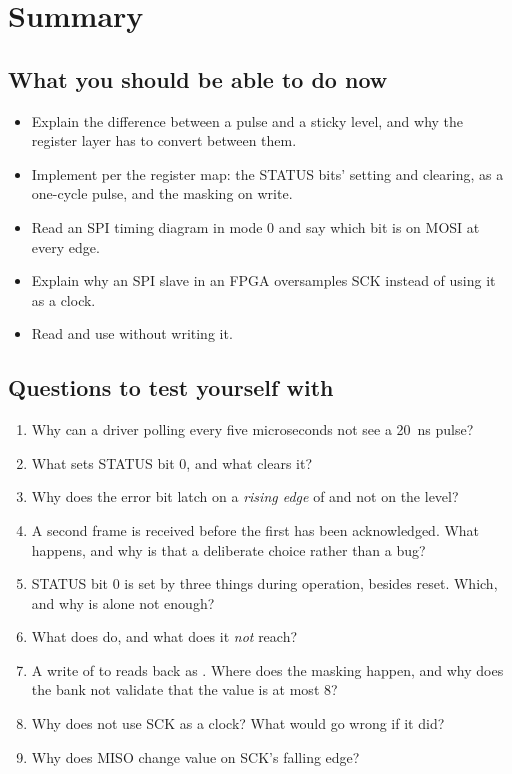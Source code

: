 
\section{Summary}
\label{c18:sec:review}

\subsection*{What you should be able to do now}
\begin{itemize}
  \item Explain the difference between a pulse and a sticky level, and why the register layer has to
    convert between them.
  \item Implement  per the register map: the STATUS bits' setting and
    clearing,  as a one-cycle pulse, and the masking on write.
  \item Read an SPI timing diagram in mode 0 and say which bit is on MOSI at every edge.
  \item Explain why an SPI slave in an FPGA oversamples SCK instead of using it as a clock.
  \item Read and use  without writing it.
\end{itemize}

\subsection*{Questions to test yourself with}
\begin{enumerate}
  \item Why can a driver polling every five microseconds not see a 20~ns pulse?
  \item What sets STATUS bit 0, and what clears it?
  \item Why does the error bit latch on a \emph{rising edge} of  and not on the level?
  \item A second frame is received before the first has been acknowledged. What happens, and why is
    that a deliberate choice rather than a bug?
  \item STATUS bit 0 is set by three things during operation, besides reset. Which, and why is
     alone not enough?
  \item What does  do, and what does it \emph{not} reach?
  \item A write of  to  reads back as . Where does the
    masking happen, and why does the bank not validate that the value is at most 8?
  \item Why does  not use SCK as a clock? What would go wrong if it did?
  \item Why does MISO change value on SCK's falling edge?
\end{enumerate}

